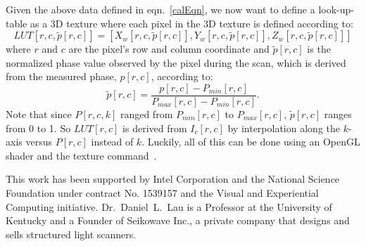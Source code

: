 \documentclass[]{spie}  %
\begin{document}
Given the above data defined in eqn.~\ref{calEqn}, we now want to define a look-up-table as a 3D texture where each pixel in the 3D texture is defined according to:
\begin{equation}
LUT[r,c,\tilde{p}[r,c]] = [X_w[r,c,\tilde{p}[r,c]], Y_w[r,c,\tilde{p}[r,c]], Z_w[r,c,\tilde{p}[r,c]]]
\end{equation}
where $r$ and $c$ are the pixel’s row and column coordinate and $\tilde{p}[r,c]$ is the normalized phase value observed by the pixel during the scan, which is derived from the measured phase, $p[r,c]$, according to:
\begin{equation}
\tilde{p}[r,c] = \frac{p[r,c] - P_{min}[r,c]}{P_{max}[r,c] - P_{min}[r,c]}.
\end{equation}
Note that since $P[r,c,k]$ ranged from $P_{min}[r,c]$ to $P_{max}[r,c]$, $\tilde{p}[r,c]$ ranges from 0 to 1.  So $LUT[r,c]$ is derived from $I_c[r,c]$ by interpolation along the $k$-axis versus $P[r,c]$ instead of $k$. Luckily, all of this can be done using an OpenGL shader and the texture command~\cite{??}.





\acknowledgments
This work has been supported by Intel Corporation and the National Science Foundation under contract No. 1539157 and the Visual and Experiential Computing initiative. Dr.~Daniel~L.~Lau is a Professor at the University of Kentucky and a Founder of Seikowave Inc., a private company that designs and sells structured light scanners.

\end{document}
